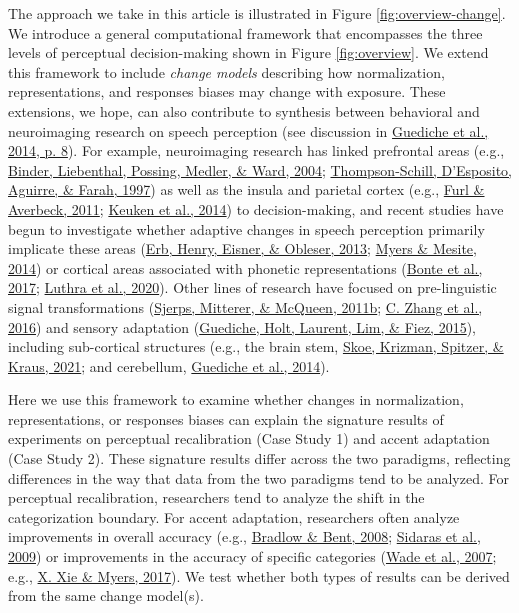 \documentclass[
  11pt,
  english,
  man,floatsintext]{apa6}
\begin{document}
The approach we take in this article is illustrated in Figure \ref{fig:overview-change}. We introduce a general computational framework that encompasses the three levels of perceptual decision-making shown in Figure \ref{fig:overview}. We extend this framework to include \emph{change models} describing how normalization, representations, and responses biases may change with exposure. These extensions, we hope, can also contribute to synthesis between behavioral and neuroimaging research on speech perception (see discussion in \protect\hyperlink{ref-guediche2014}{Guediche et al., 2014, p. 8}). For example, neuroimaging research has linked prefrontal areas (e.g., \protect\hyperlink{ref-binder2004neural}{Binder, Liebenthal, Possing, Medler, \& Ward, 2004}; \protect\hyperlink{ref-thompson1997role}{Thompson-Schill, D'Esposito, Aguirre, \& Farah, 1997}) as well as the insula and parietal cortex (e.g., \protect\hyperlink{ref-furl2011parietal}{Furl \& Averbeck, 2011}; \protect\hyperlink{ref-keuken2014}{Keuken et al., 2014}) to decision-making, and recent studies have begun to investigate whether adaptive changes in speech perception primarily implicate these areas (\protect\hyperlink{ref-erb2013brain}{Erb, Henry, Eisner, \& Obleser, 2013}; \protect\hyperlink{ref-myers-mesite2014}{Myers \& Mesite, 2014}) or cortical areas associated with phonetic representations (\protect\hyperlink{ref-bonte2017}{Bonte et al., 2017}; \protect\hyperlink{ref-luthra2020}{Luthra et al., 2020}). Other lines of research have focused on pre-linguistic signal transformations (\protect\hyperlink{ref-sjerps2011listening}{Sjerps, Mitterer, \& McQueen, 2011b}; \protect\hyperlink{ref-zhang2016functionally}{C. Zhang et al., 2016}) and sensory adaptation (\protect\hyperlink{ref-guediche2015evidence}{Guediche, Holt, Laurent, Lim, \& Fiez, 2015}), including sub-cortical structures (e.g., the brain stem, \protect\hyperlink{ref-skoe2021auditory}{Skoe, Krizman, Spitzer, \& Kraus, 2021}; and cerebellum, \protect\hyperlink{ref-guediche2014}{Guediche et al., 2014}).

Here we use this framework to examine whether changes in normalization, representations, or responses biases can explain the signature results of experiments on perceptual recalibration (Case Study 1) and accent adaptation (Case Study 2).
These signature results differ across the two paradigms, reflecting differences in the way that data from the two paradigms tend to be analyzed. For perceptual recalibration, researchers tend to analyze the shift in the categorization boundary. For accent adaptation, researchers often analyze improvements in overall accuracy (e.g., \protect\hyperlink{ref-bradlow-bent2008}{Bradlow \& Bent, 2008}; \protect\hyperlink{ref-sidaras2009}{Sidaras et al., 2009}) or improvements in the accuracy of specific categories (\protect\hyperlink{ref-wade2007}{Wade et al., 2007}; e.g., \protect\hyperlink{ref-xie2017}{X. Xie \& Myers, 2017}). We test whether both types of results can be derived from the same change model(s).
\end{document}
